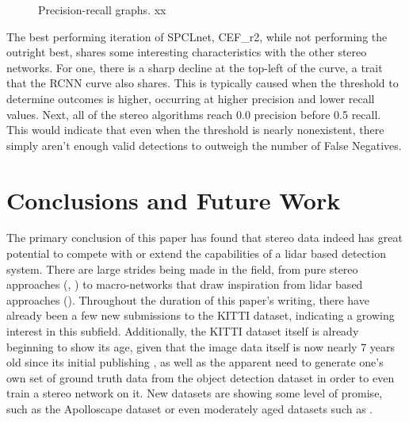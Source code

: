 \begin{figure}[H]
	\centering
	\caption{Precision-recall graphs. xx}
	\label{fpnet_pr4}
\end{figure}

The best performing iteration of SPCLnet, CEF\_r2, while not performing the outright best, shares some interesting characteristics with the other stereo networks. For one, there is a sharp decline at the top-left of the curve, a trait that the RCNN curve also shares. This is typically caused when the threshold to determine outcomes is higher, occurring at higher precision and lower recall values. Next, all of the stereo algorithms reach 0.0 precision before 0.5 recall. This would indicate that even when the threshold is nearly nonexistent, there simply aren't enough valid detections to outweigh the number of False Negatives. 

\newpage
\section{Conclusions and Future Work}
\label{sect_conclusions}

The primary conclusion of this paper has found that stereo data indeed has great potential to compete with or extend the capabilities of a lidar based detection system. There are large strides being made in the field, from pure stereo approaches (\cite{zeng2018rt3d}, \cite{li_stereo_2019}) to macro-networks that draw inspiration from lidar based approaches (\cite{wang_pseudo-lidar_2019}). Throughout the duration of this paper's writing, there have already been a few new submissions to the KITTI dataset, indicating a growing interest in this subfield. Additionally, the KITTI dataset itself is already beginning to show its age, given that the image data itself is now nearly 7 years old since its initial publishing \cite{geiger_are_2012}, as well as the apparent need to generate one's own set of ground truth data from the object detection dataset in order to even train a stereo network on it. New datasets are showing some level of promise, such as the Apolloscape dataset \cite{huang_apolloscape_2018} or even moderately aged datasets such as \cite{cordts_cityscapes_2016}.

